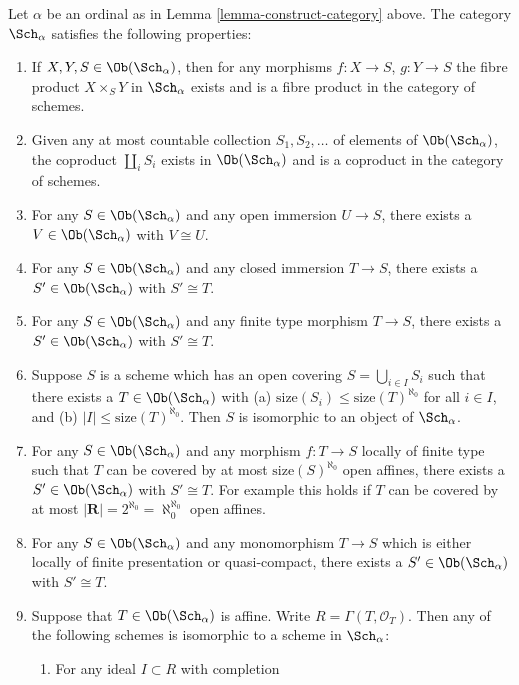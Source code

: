\begin{lemma}
\label{lemma-what-is-in-it}
Let $\alpha$ be an ordinal as in Lemma \ref{lemma-construct-category} above.
The category $\Sch_\alpha$ satisfies the following
properties:
\begin{enumerate}
\item If $X, Y, S \in \Ob(\Sch_\alpha)$, then
for any morphisms $f : X \to S$, $g : Y \to S$ the fibre
product $X \times_S Y$ in $\Sch_\alpha$ exists
and is a fibre product in the category of schemes.
\item Given any at most countable collection $S_1, S_2, \ldots$
of elements of $\Ob(\Sch_\alpha)$, the coproduct
$\coprod_i S_i$ exists in $\Ob(\Sch_\alpha)$ and
is a coproduct in the category of schemes.
\item For any $S \in \Ob(\Sch_\alpha)$ and
any open immersion $U \to S$, there exists a
$V \in \Ob(\Sch_\alpha)$ with $V \cong U$.
\item For any $S \in \Ob(\Sch_\alpha)$ and
any closed immersion $T \to S$, there exists a
$S' \in \Ob(\Sch_\alpha)$ with $S' \cong T$.
\item For any $S \in \Ob(\Sch_\alpha)$ and
any finite type morphism $T \to S$, there exists a
$S' \in \Ob(\Sch_\alpha)$ with $S' \cong T$.
\item Suppose $S$ is a scheme which has an open covering
$S = \bigcup_{i \in I} S_i$ such that there exists
a $T \in \Ob(\Sch_\alpha)$ with
(a) $\text{size}(S_i) \leq \text{size}(T)^{\aleph_0}$ for all
$i \in I$, and (b) $|I| \leq \text{size}(T)^{\aleph_0}$.
Then $S$ is isomorphic to an object of $\Sch_\alpha$.
\item For any $S \in \Ob(\Sch_\alpha)$ and
any morphism $f : T \to S$ locally of finite type such
that $T$ can be covered by at most
$\text{size}(S)^{\aleph_0}$ open affines, there exists a
$S' \in \Ob(\Sch_\alpha)$ with $S' \cong T$.
For example this holds if $T$ can be covered by at most
$|\mathbf{R}| = 2^{\aleph_0} = \aleph_0^{\aleph_0}$ open affines.
\item For any $S \in \Ob(\Sch_\alpha)$ and
any monomorphism $T \to S$ which is either locally of finite presentation
or quasi-compact, there exists a
$S' \in \Ob(\Sch_\alpha)$ with $S' \cong T$.
\item Suppose that $T \in \Ob(\Sch_\alpha)$ is
affine. Write $R = \Gamma(T, \mathcal{O}_T)$.
Then any of the following schemes is isomorphic to a scheme
in $\Sch_\alpha$:
\begin{enumerate}
\item For any ideal $I \subset R$ with completion

\end{enumerate}
\end{enumerate}
\end{lemma}
